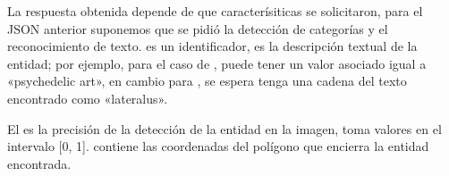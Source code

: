 \begin{sphinxVerbatim}[commandchars=\\\{\}]
   \PYG{p}{[}
         \PYG{p}{[}
             
             
             
        \PYG{p}{]}
         \PYG{p}{[}
               
               
               
               
                 \PYG{p}{[}
                     
                     
                \PYG{p}{]}
        \PYG{p}{]}
  \PYG{p}{]}
\end{sphinxVerbatim}

La respuesta obtenida depende de que caracterísiticas se solicitaron,
para el JSON anterior suponemos que se pidió la detección de
categorías y el reconocimiento de texto.  es un identificador,
 es la descripción textual de la entidad; por ejemplo,
para el caso de ,  puede tener un valor
asociado igual a «psychedelic art», en cambio para ,
se espera tenga una cadena del texto encontrado como «lateralus».

El  es la precisión de la detección de la entidad en la imagen,
toma valores en el intervalo {[}0, 1{]}.  contiene
las coordenadas del polígono que encierra la entidad encontrada.



